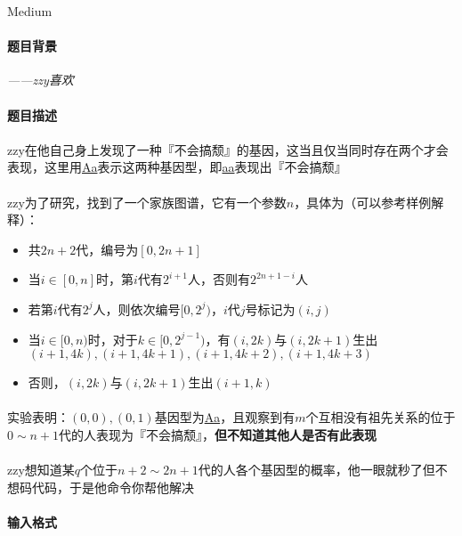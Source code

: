 \documentclass[UTF8]{ctexart}
\begin{document}
\begin{center}
	\large{Medium}
\end{center}
\paragraph{题目背景}
\begin{center}
	\color[rgb]{0.5,0.5,0.5}\emph{——zzy喜欢}
\end{center}
\paragraph{题目描述}
\paragraph{}zzy在他自己身上发现了一种『不会搞颓』的基因，这当且仅当同时存在两个才会表现，这里用\underline{Aa}表示这两种基因型，即\underline{aa}表现出『不会搞颓』
\paragraph{}zzy为了研究，找到了一个家族图谱，它有一个参数$n$，具体为（可以参考样例解释）：
\begin{itemize}
	\item 共$2n+2$代，编号为$[0,2n+1]$
	\item 当$i\in[0,n]$时，第$i$代有$2^{i+1}$人，否则有$2^{2n+1-i}$人
	\item 若第$i$代有$2^j$人，则依次编号$[0,2^j)$，$i$代$j$号标记为$(i,j)$
	\item 当$i\in[0,n)$时，对于$k\in[0,2^{j-1})$，有$(i,2k)$与$(i,2k+1)$生出$(i+1,4k),(i+1,4k+1),(i+1,4k+2),(i+1,4k+3)$
	\item 否则，$(i,2k)$与$(i,2k+1)$生出$(i+1,k)$
\end{itemize}
\paragraph{}实验表明：$(0,0),(0,1)$基因型为\underline{Aa}，且观察到有$m$个互相没有祖先关系的位于$0\sim n+1$代的人表现为『不会搞颓』，\textbf{但不知道其他人是否有此表现}
\paragraph{}zzy想知道某$q$个位于$n+2\sim 2n+1$代的人各个基因型的概率，他一眼就秒了但不想码代码，于是他命令你帮他解决
\paragraph{输入格式}
\end{document}
